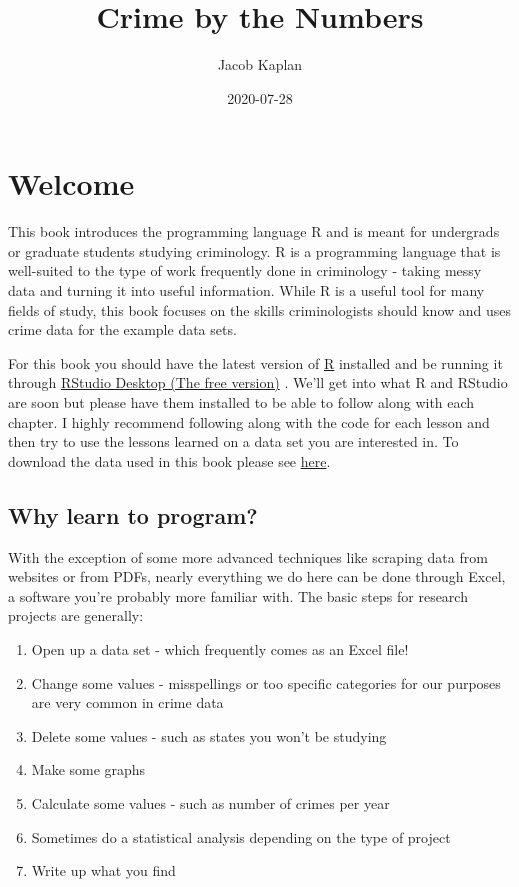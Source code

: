 \documentclass[
  12pt,
]{book}
\title{Crime by the Numbers}
\author{Jacob Kaplan}
\date{2020-07-28}
\providecommand{\tightlist}{%
  \setlength{\itemsep}{0pt}\setlength{\parskip}{0pt}}
\begin{document}
\maketitle

{
\hypersetup{linkcolor=}
\setcounter{tocdepth}{2}
\tableofcontents
}
\hypertarget{welcome}{%
\chapter*{Welcome}\label{welcome}}


This book introduces the programming language R and is meant for undergrads or graduate students studying criminology. R is a programming language that is well-suited to the type of work frequently done in criminology - taking messy data and turning it into useful information. While R is a useful tool for many fields of study, this book focuses on the skills criminologists should know and uses crime data for the example data sets.

For this book you should have the latest version of \href{https://cloud.r-project.org/}{R} installed and be running it through \href{https://www.rstudio.com/products/rstudio/download/}{RStudio Desktop (The free version)} . We'll get into what R and RStudio are soon but please have them installed to be able to follow along with each chapter. I highly recommend following along with the code for each lesson and then try to use the lessons learned on a data set you are interested in. To download the data used in this book please see \href{https://github.com/jacobkap/r4crimz/tree/master/data}{here}.

\hypertarget{why-learn-to-program}{%
\section*{Why learn to program?}\label{why-learn-to-program}}


With the exception of some more advanced techniques like scraping data from websites or from PDFs, nearly everything we do here can be done through Excel, a software you're probably more familiar with. The basic steps for research projects are generally:

\begin{enumerate}
\def\labelenumi{\arabic{enumi}.}
\tightlist
\item
  Open up a data set - which frequently comes as an Excel file!
\item
  Change some values - misspellings or too specific categories for our purposes are very common in crime data
\item
  Delete some values - such as states you won't be studying
\item
  Make some graphs
\item
  Calculate some values - such as number of crimes per year
\item
  Sometimes do a statistical analysis depending on the type of project
\item
  Write up what you find
\end{enumerate}
\end{document}
